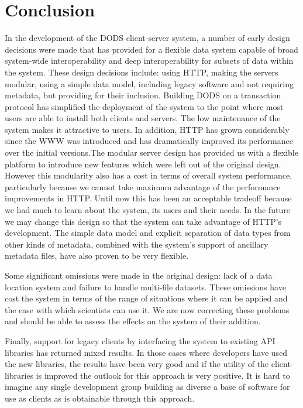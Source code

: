 \documentclass{article}
\begin{document}
\section{Conclusion}
\label{conclusion}

In the development of the \ac{DODS} client-server system, a number of early
design decisions were made that has provided for a flexible data system
capable of broad system-wide interoperability and deep interoperability for
subsets of data within the system. These design decisions include: using
\acs{HTTP}, making the servers modular, using a simple data model, including
legacy software and not requiring metadata, but providing for their
inclusion.  Building \ac{DODS} on a transaction protocol has simplified the
deployment of the system to the point where most users are able to install
both clients and servers. The low maintenance of the system makes it
attractive to users. In addition, \acs{HTTP} has grown considerably since the
\ac{WWW} was introduced and has dramatically improved its performance over
the initial versions.The modular server design has provided us with a
flexible platform to introduce new features which were left out of the
original design. However this modularity also has a cost in terms of overall
system performance, particularly because we cannot take maximum advantage of
the performance improvements in \acs{HTTP}.  Until now this has been an
acceptable tradeoff because we had much to learn about the system, its users
and their needs. In the future we may change this design so that the system
can take advantage of \acs{HTTP}'s development. The simple data model and
explicit separation of data types from other kinds of metadata, combined with
the system's support of ancillary metadata files, have also proven to be very
flexible.

Some significant omissions were made in the original design: lack of a data
location system and failure to handle multi-file datasets. These omissions
have cost the system in terms of the range of situations where it can be
applied and the ease with which scientists can use it. We are now correcting
these problems and should be able to assess the effects on the system of
their addition.

Finally, support for legacy clients by interfacing the system to existing
\ac{API} libraries has returned mixed results. In those cases where
developers have used the new libraries, the results have been very good and
if the utility of the client-libraries is improved the outlook for this
approach is very positive. It is hard to imagine any single development group
building as diverse a base of software for use as clients as is obtainable
through this approach.
\end{document}
